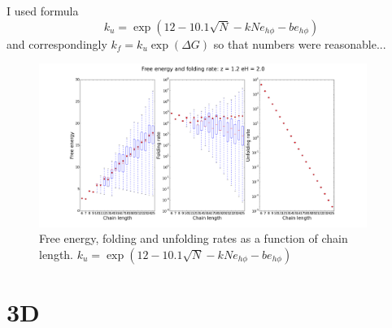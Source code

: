 \documentclass[12pt]{paper}
\newcommand{\gD}{\Delta}
\begin{document}
I used formula
\begin{equation}
 k_u = \exp(12-10.1 \sqrt{N} -kNe_{h\phi} -be_{h\phi})
\end{equation}
and correspondingly $k_f=k_u\exp(\gD G)$ so that numbers were reasonable...
\begin{figure}[h!]
  \centering
  \includegraphics[width=0.95\textwidth]{pictures/foldingModel3.png} 
  \caption{Free energy, folding and unfolding rates as a function of chain length. $ k_u = 
\exp(12-10.1 \sqrt{N} -kNe_{h\phi} -be_{h\phi})$}
\end{figure} 



\newpage
\newpage
\section{3D}
\end{document}
